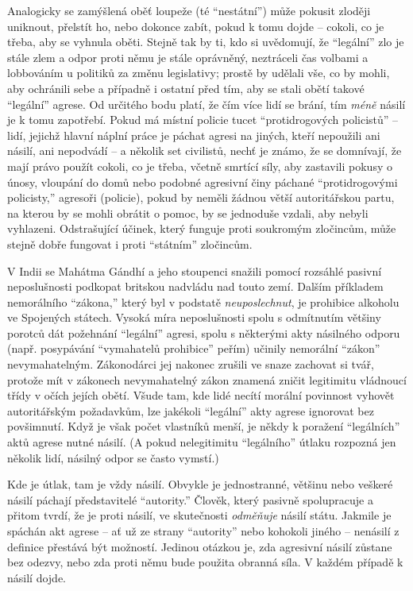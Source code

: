 \documentclass{book}
\begin{document}
Analogicky se zamýšlená oběť loupeže (té \enquote{nestátní}) může pokusit zloději uniknout, přelstít ho, nebo dokonce zabít, pokud k tomu dojde -- cokoli, co je třeba, aby se vyhnula oběti. Stejně tak by ti, kdo si uvědomují, že \enquote{legální} zlo je stále zlem a odpor proti němu je stále oprávněný, neztráceli čas volbami a lobbováním u politiků za změnu legislativy; prostě by udělali vše, co by mohli, aby ochránili sebe a případně i ostatní před tím, aby se stali obětí takové \enquote{legální} agrese. Od určitého bodu platí, že čím více lidí se brání, tím \emph{méně} násilí je k tomu zapotřebí. Pokud má místní policie tucet \enquote{protidrogových policistů} -- lidí, jejichž hlavní náplní práce je páchat agresi na jiných, kteří nepoužili ani násilí, ani nepodvádí -- a několik set civilistů, nechť je známo, že se domnívají, že mají právo použít cokoli, co je třeba, včetně smrtící síly, aby zastavili pokusy o únosy, vloupání do domů nebo podobné agresivní činy páchané \enquote{protidrogovými policisty,} agresoři (policie), pokud by neměli žádnou větší autoritářskou partu, na kterou by se mohli obrátit o pomoc, by se jednoduše vzdali, aby nebyli vyhlazeni. Odstrašující účinek, který funguje proti soukromým zločincům, může stejně dobře fungovat i proti \enquote{státním} zločincům.

V Indii se Mahátma Gándhí a jeho stoupenci snažili pomocí rozsáhlé pasivní neposlušnosti podkopat britskou nadvládu nad touto zemí. Dalším příkladem nemorálního \enquote{zákona,} který byl v podstatě \emph{neuposlechnut}, je prohibice alkoholu ve Spojených státech. Vysoká míra neposlušnosti spolu s odmítnutím většiny porotců dát požehnání \enquote{legální} agresi, spolu s některými akty násilného odporu (např. posypávání \enquote{vymahatelů prohibice} peřím) učinily nemorální \enquote{zákon} nevymahatelným. Zákonodárci jej nakonec zrušili ve snaze zachovat si tvář, protože mít v zákonech nevymahatelný zákon znamená zničit legitimitu vládnoucí třídy v očích jejích obětí. Všude tam, kde lidé necítí morální povinnost vyhovět autoritářským požadavkům, lze jakékoli \enquote{legální} akty agrese ignorovat bez povšimnutí. Když je však počet vlastníků menší, je někdy k poražení \enquote{legálních} aktů agrese nutné násilí. (A pokud nelegitimitu \enquote{legálního} útlaku rozpozná jen několik lidí, násilný odpor se často vymstí.)

Kde je útlak, tam je vždy násilí. Obvykle je jednostranné, většinu nebo veškeré násilí páchají představitelé \enquote{autority.} Člověk, který pasivně spolupracuje a přitom tvrdí, že je proti násilí, ve skutečnosti \emph{odměňuje} násilí státu. Jakmile je spáchán akt agrese -- ať už ze strany \enquote{autority} nebo kohokoli jiného -- nenásilí z definice přestává být možností. Jedinou otázkou je, zda agresivní násilí zůstane bez odezvy, nebo zda proti němu bude použita obranná síla. V každém případě k násilí dojde.
\end{document}
